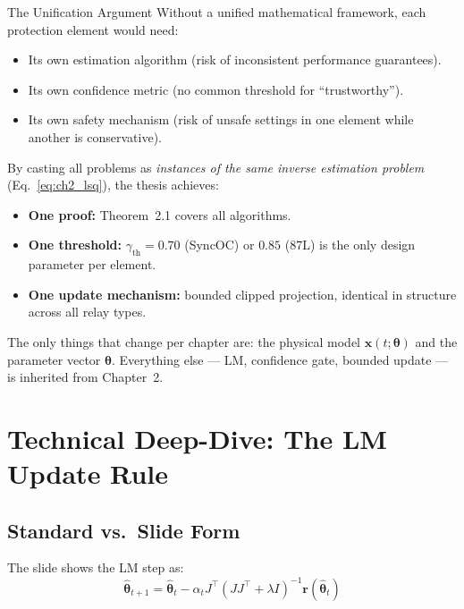 \documentclass[12pt,a4paper]{article}
\newcommand{\thetahat}{\hat{\bm{\theta}}}
\newcommand{\rvec}{\mathbf{r}}
\newcommand{\gammath}{\gamma_\mathrm{th}}
\begin{document}
\begin{archbox}{The Unification Argument}
Without a unified mathematical framework, each protection element would need:
\begin{itemize}[nosep]
  \item Its own estimation algorithm (risk of inconsistent performance guarantees).
  \item Its own confidence metric (no common threshold for ``trustworthy'').
  \item Its own safety mechanism (risk of unsafe settings in one element while
        another is conservative).
\end{itemize}

By casting all problems as \emph{instances of the same inverse estimation problem}
(Eq.~\eqref{eq:ch2_lsq}), the thesis achieves:
\begin{itemize}[nosep]
  \item \textbf{One proof:} Theorem~2.1 covers all algorithms.
  \item \textbf{One threshold:} $\gammath = 0.70$ (SyncOC) or $0.85$ (87L)
        is the only design parameter per element.
  \item \textbf{One update mechanism:} bounded clipped projection, identical in
        structure across all relay types.
\end{itemize}

The only things that change per chapter are: the physical model $\mathbf{x}(t;\bm{\theta})$
and the parameter vector $\bm{\theta}$.  Everything else --- LM, confidence gate,
bounded update --- is inherited from Chapter~2.
\end{archbox}

\section{Technical Deep-Dive: The LM Update Rule}

\subsection{Standard vs.\ Slide Form}

The slide shows the LM step as:
\begin{equation}
  \thetahat_{t+1} = \thetahat_t
    - \alpha_t J^\top\!(JJ^\top + \lambda I)^{-1}\rvec(\thetahat_t)
  \label{eq:slide_lm}
\end{equation}
\end{document}

